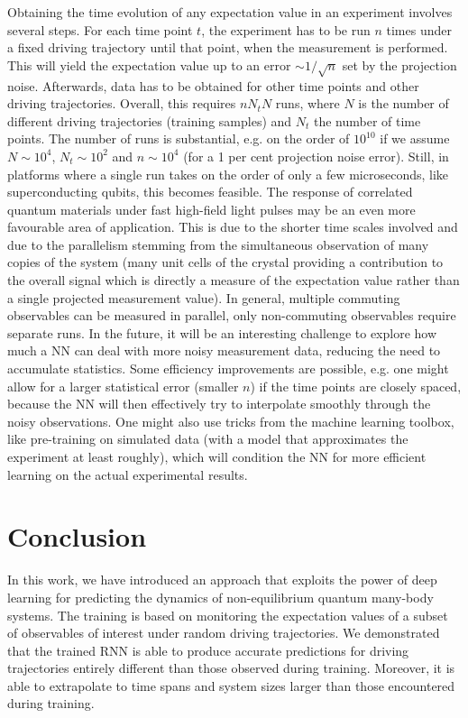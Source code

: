 \documentclass[a4paper,aps,amsmath,amssymb,twocolumn,longbibliography,,accepted=2022-05-17]{quantumarticle}
\begin{document}
Obtaining the time evolution of any expectation value in an experiment involves several steps. For each time point $t$, the experiment has to be run $n$ times under a fixed driving trajectory until that point, when the measurement is performed. This will yield the expectation value up to an error $\sim 1/\sqrt{n}$ set by the projection noise. Afterwards, data has to be obtained for other time points and other driving trajectories. Overall, this requires $n N_t N$ runs, where $N$ is the number of different driving trajectories (training samples) and $N_t$ the number of time points. The number of runs is substantial, e.g. on the order of $10^{10}$ if we assume $N\sim 10^4$, $N_t\sim 10^2$ and $n\sim 10^4$ (for a 1 per cent projection noise error). Still, in platforms where a single run takes on the order of only a few microseconds, like superconducting qubits, this becomes feasible. The response of correlated quantum materials under fast high-field light pulses may be an even more favourable area of application. This is due to the shorter time scales involved and due to the parallelism stemming from the simultaneous observation of many copies of the system (many unit cells of the crystal providing a contribution to the overall signal which is directly a measure of the expectation value rather than a single projected measurement value). In general, multiple commuting observables can be measured in parallel, only non-commuting observables require separate runs.  In the future, it will be an interesting challenge to explore how much a NN can deal with more noisy measurement data, reducing the need to accumulate statistics. Some efficiency improvements are possible, e.g. one might allow for a larger statistical error (smaller $n$) if the time points are closely spaced, because the NN will then effectively try to interpolate smoothly through the noisy observations. One might also use tricks from the machine learning toolbox, like pre-training on simulated data (with a model that approximates the experiment at least roughly), which will condition the NN for more efficient learning on the actual experimental results.

\section{Conclusion\label{conclusion and discussion}}


In this work, we have introduced an approach that exploits the power of deep learning for predicting the dynamics of non-equilibrium quantum many-body systems.  The training is based on monitoring the expectation values of a subset of observables of interest under random driving trajectories.   We demonstrated that the trained RNN is able to produce accurate predictions for driving trajectories entirely different than those observed during training. Moreover, it is able to extrapolate to time spans and system sizes larger than those encountered during training.
\end{document}

